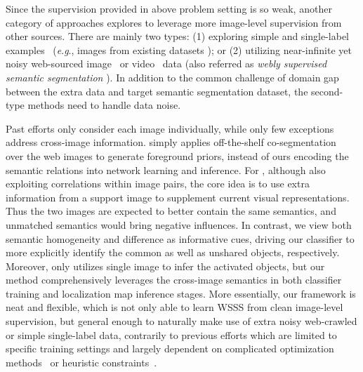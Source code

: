 \documentclass[runningheads]{llncs}
\newcommand{\eg}{\textit{e}.\textit{g}.}
\begin{document}
Since the supervision provided in above problem setting is so weak, another category of approaches explores to leverage more image-level supervision from other sources. There are mainly two types: (1) exploring simple and single-label examples~\cite{pinheiro2015image,li2019attention} (\eg, images from existing datasets \cite{russakovsky2015imagenet,griffin2007caltech}); or (2) utilizing near-infinite yet noisy web-sourced image~\cite{shen2017weakly,hong2017weakly,shen2018bootstrapping,wei2016stc} or video~\cite{tokmakov2016weakly,hong2017weakly,lee2019frame} data (also referred as \textit{webly supervised semantic segmentation} \cite{jin2017webly}). In addition to the common challenge of domain gap between the extra data and target semantic segmentation dataset, the second-type methods need to handle data noise.

Past efforts only consider each image individually, while only few exceptions~\cite{shen2017weakly,fan2020cian} address cross-image information. \cite{shen2017weakly} simply applies off-the-shelf co-segmentation~\cite{joulin2010discriminative} over the web images to generate foreground priors, instead of ours encoding the semantic relations into network learning and inference. For \cite{fan2020cian}, although also exploiting correlations within image pairs, the core idea is to use extra information from a support image to supplement current visual representations. Thus the two images are expected to better contain the same semantics, and unmatched semantics would bring negative influences. In contrast, we view both semantic homogeneity and difference as informative cues, driving our classifier to more explicitly identify the common as well as unshared objects, respectively.  Moreover, \cite{fan2020cian} only utilizes single image to infer the activated objects, but our method comprehensively leverages the cross-image semantics in both classifier training and localization map inference stages. More essentially, our framework is neat and flexible, which is not only able to learn WSSS from clean image-level supervision, but general enough to naturally make use of extra noisy web-crawled or simple single-label data, contrarily to previous efforts which are limited to specific training settings and largely dependent on complicated optimization methods~\cite{hong2017weakly,tokmakov2016weakly} or heuristic
constraints~\cite{shen2018bootstrapping}.
\end{document}
